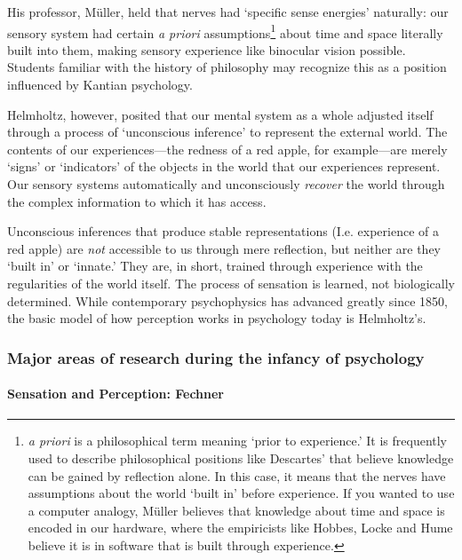 His professor, Müller, held that nerves had `specific sense energies' naturally: our sensory system had certain \emph{a priori} assumptions\footnote{\emph{a priori} is a philosophical term meaning ‘prior to experience.’ It is frequently used to describe philosophical positions like Descartes’ that believe knowledge can be gained by reflection alone. In this case, it means that the nerves have assumptions about the world ‘built in’ before experience. If you wanted to use a computer analogy, Müller believes that knowledge about time and space is encoded in our hardware, where the empiricists like Hobbes, Locke and Hume believe it is in software that is built through experience.} about time and space literally built into them, making sensory experience like binocular vision possible. Students familiar with the history of philosophy may recognize this as a position influenced by Kantian psychology.

Helmholtz, however, posited that our mental system as a whole adjusted itself through a process of `unconscious inference' to represent the external world. The contents of our experiences---the redness of a red apple, for example---are merely `signs' or `indicators' of the objects in the world that our experiences represent. Our sensory systems automatically and unconsciously \emph{recover} the world through the complex information to which it has access. 

Unconscious inferences that produce stable representations (I.e. experience of a red apple) are \emph{not} accessible to us through mere reflection, but neither are they ‘built in’ or ‘innate.’ They are, in short, trained through experience with the regularities of the world itself. The process of sensation is learned, not biologically determined. While contemporary psychophysics has advanced greatly since 1850, the basic model of how perception works in psychology today is Helmholtz's.

\subsubsection{Major areas of research during the infancy of psychology}
\label{majorareasofresearchduringtheinfancyofpsychology}

\paragraph{Sensation and Perception: Fechner}
\label{sensationandperception:fechner}

